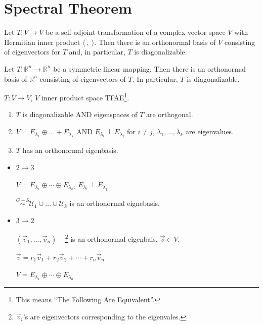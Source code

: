 \documentclass[11pt,fleqn]{book} %
\begin{document}
\section{Spectral Theorem}

\setcounter{chapter}{5}
\setcounter{section}{3}
\setcounter{dummy}{11}
\begin{theorem}
    Let $T: V \to V$ be a self-adjoint transformation of a complex vector space $V$ with Hermitian inner product $\langle ~,~ \rangle$. Then there is an orthonormal basis of $V$ consisting of eigenvectors for $T$ and, in particular, $T$ is diagonalizable.
\end{theorem}

\setcounter{chapter}{4}
\setcounter{section}{6}
\setcounter{dummy}{0}
\begin{theorem}
    Let $T: \mathbb{R}^n \to \mathbb{R}^n$ be a symmetric linear mapping. Then there is an orthonormal basis of $\mathbb{R}^n$ consisting of eigenvectors of $T$. In particular, $T$ is diagonalizable.
\end{theorem}
\setcounter{chapter}{3}

$T: V \to V$, $V$ inner product space TFAE\footnote{This means ``The Following Are Equivalent''. }.

\begin{enumerate}
    \item $T$ is diagonalizable AND eigenspaces of $T$ are orthogonal.
    \item $V = E_{\lambda_1} \oplus \dots + E_{\lambda_k}$ AND $E_{\lambda_i} \perp E_{\lambda_j}$ for $i \neq j$, $\lambda_1, \dots, \lambda_k$ are eigenvalues.
    \item $T$ has an orthonormal eigenbasis.
\end{enumerate}

\begin{itemize}
    \item $2 \to 3$

    $V = E_{\lambda_1} \oplus \cdots \oplus E_{\lambda_k}$, $E_{\lambda_i} \perp E_{\lambda_j}$

    $\overset{G-S}{\sim} \mathcal{U}_1 \cup \dots \cup \mathcal{U}_k$ is an orthonormal eignebasis.

    \item $3 \to 2$

    $(\vec{v}_1, \dots, \vec{v}_n)$ ~ \footnote{$\vec{v}_i$'s are eigenvectors corresponding to the eigenvales. } is an orthonormal eigenbais, $\vec{v} \in V$.

    $\vec{v} = r_1\vec{v}_1 + r_2\vec{v}_2 + \cdots + r_n\vec{v}_n$

    $V = E_{\lambda_1} \oplus \cdots \oplus E_{\lambda_n}$
\end{itemize}
\end{document}
